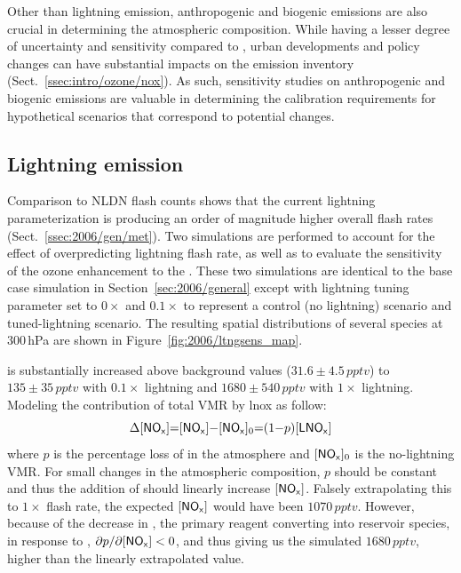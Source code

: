 Other than lightning emission, anthropogenic and biogenic emissions are also crucial in determining the atmospheric composition. While having a lesser
degree of uncertainty and sensitivity compared to {\lnox}, urban developments and policy changes can have substantial impacts on the emission inventory
(Sect.~\ref{ssec:intro/ozone/nox}). As such, sensitivity studies on anthropogenic and biogenic emissions are valuable in determining the calibration
requirements for hypothetical scenarios that correspond to potential changes.

\subsection{Lightning emission}\label{ssec:2006/sens/lnox}

Comparison to NLDN flash counts shows that the current lightning parameterization is producing an order of magnitude higher overall flash rates
(Sect.~\ref{ssec:2006/gen/met}). Two simulations are performed to account for the effect of overpredicting lightning flash rate, as well as to evaluate
the sensitivity of the ozone enhancement to the {\lnox}. These two simulations are identical to the base case simulation in Section~\ref{sec:2006/general}
except with lightning tuning parameter set to $0\times$ and $0.1\times$ to represent a control (no lightning) scenario and tuned-lightning scenario. The
resulting spatial distributions of several species at 300\,\unit{hPa} are shown in Figure~\ref{fig:2006/ltngsens_map}.


 is substantially increased above background values ($31.6\pm4.5\,\unit{pptv}$) to $135\pm35\,\unit{pptv}$ with $0.1\times$ lightning and
$1680\pm540\,\unit{pptv}$ with $1\times$ lightning. Modeling the contribution of total  VMR by {lnox} as follow:
\begin{equation}\label{eqn:nox+lnox}
	\Delta[\chem{NO_x}] = [\chem{NO_x}]-[\chem{NO_x}]_0 = (1-p)[\chem{LNO_x}]
\end{equation}
where $p$ is the percentage loss of {\lnox} in the atmosphere and $[\chem{NO_x}]_0$ is the no-lightning  VMR. For small changes in the
atmospheric composition, $p$ should be constant and thus the addition of {\lnox} should linearly increase $[\chem{NO_x}]$. Falsely extrapolating this
to $1\times$ flash rate, the expected $[\chem{NO_x}]$ would have been $1070\,\unit{pptv}$. However, because of the decrease in , the
primary reagent converting  into reservoir species, in response to {\lnox}, $\partial p/\partial [\chem{NO_x}] < 0$, and thus giving us the
simulated $1680\,\unit{pptv}$, higher than the linearly extrapolated value.

